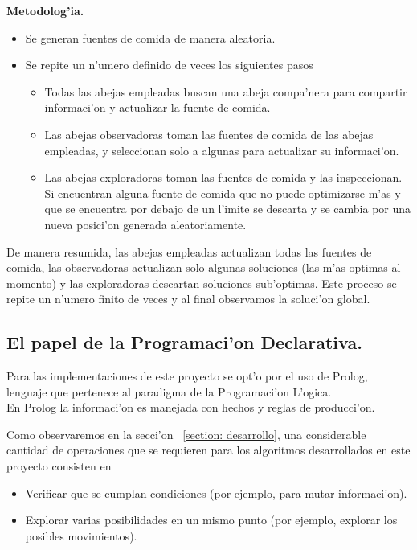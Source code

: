 \documentclass[12pt]{article}
\begin{document}
    \textbf{Metodolog'ia.}
    \begin{itemize}
        \item Se generan fuentes de comida de manera aleatoria.
        \item Se repite un n'umero definido de veces los siguientes pasos
            \begin{itemize}
                \setlength\itemsep{0em}
                \item Todas las abejas empleadas buscan una abeja compa'nera para compartir informaci'on y actualizar
                    la fuente de comida.
                \item Las abejas observadoras toman las fuentes de comida de las abejas empleadas, y seleccionan
                    solo a algunas para actualizar su informaci'on.
                \item Las abejas exploradoras toman las fuentes de comida y las inspeccionan. Si encuentran
                alguna fuente de comida que no puede optimizarse m'as y que se encuentra por debajo de un l'imite
                se descarta y se cambia por una nueva posici'on generada aleatoriamente.

            \end{itemize}

    \end{itemize}

    De manera resumida, las abejas empleadas actualizan todas las fuentes de comida, las observadoras
    actualizan solo algunas soluciones (las m'as optimas al momento) y las exploradoras descartan soluciones
    sub'optimas. Este proceso se repite un n'umero finito de veces y al final observamos
    la soluci'on global.

    \subsection{El papel de la Programaci'on Declarativa.}
    Para las implementaciones de este proyecto se opt'o por el uso de Prolog, lenguaje que pertenece
    al paradigma de la Programaci'on L'ogica. \\
    En Prolog la informaci'on es manejada con hechos y reglas de producci'on.

    Como observaremos en la secci'on ~\ref{section: desarrollo}, una considerable cantidad de operaciones
    que se requieren para los algoritmos desarrollados en este proyecto consisten en
    \begin{itemize}
        \item Verificar que se cumplan condiciones (por ejemplo, para mutar informaci'on).
        \item Explorar varias posibilidades en un mismo punto (por ejemplo, explorar los posibles movimientos).
    \end{itemize}
\end{document}
